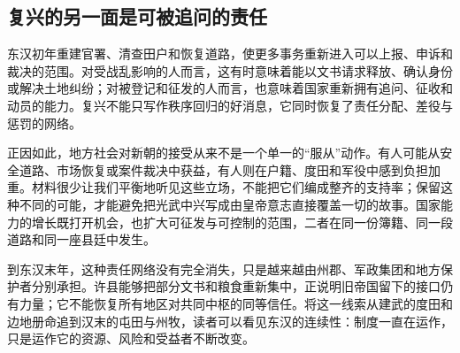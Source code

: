 \subsection{复兴的另一面是可被追问的责任}

东汉初年重建官署、清查田户和恢复道路，使更多事务重新进入可以上报、申诉和裁决的范围。对受战乱影响的人而言，这有时意味着能以文书请求释放、确认身份或解决土地纠纷；对被登记和征发的人而言，也意味着国家重新拥有追问、征收和动员的能力。复兴不能只写作秩序回归的好消息，它同时恢复了责任分配、差役与惩罚的网络。

正因如此，地方社会对新朝的接受从来不是一个单一的“服从”动作。有人可能从安全道路、市场恢复或案件裁决中获益，有人则在户籍、度田和军役中感到负担加重。材料很少让我们平衡地听见这些立场，不能把它们编成整齐的支持率；保留这种不同的可能，才能避免把光武中兴写成由皇帝意志直接覆盖一切的故事。国家能力的增长既打开机会，也扩大可征发与可控制的范围，二者在同一份簿籍、同一段道路和同一座县廷中发生。

到东汉末年，这种责任网络没有完全消失，只是越来越由州郡、军政集团和地方保护者分别承担。许县能够把部分文书和粮食重新集中，正说明旧帝国留下的接口仍有力量；它不能恢复所有地区对共同中枢的同等信任。将这一线索从建武的度田和边地册命追到汉末的屯田与州牧，读者可以看见东汉的连续性：制度一直在运作，只是运作它的资源、风险和受益者不断改变。
